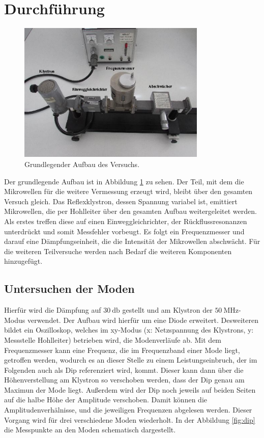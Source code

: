\section{Durchführung}
\label{sec:Durchführung}

\begin{figure}
    \centering
    \includegraphics[width=0.8\textwidth]{Bilder/grundaufbau.png}
    \caption{Grundlegender Aufbau des Versuchs.}
    \label{fig:grund}
\end{figure}
\FloatBarrier

Der grundlegende Aufbau ist in Abbildung \ref{fig:grund} zu sehen. Der Teil, mit dem die Mikrowellen für die weitere Vermessung erzeugt wird, bleibt über den 
gesamten Versuch gleich. Das Reflexklystron, dessen Spannung variabel ist, emittiert Mikrowellen, die per Hohlleiter über den gesamten Aufbau weitergeleitet werden. Als 
erstes treffen diese auf einen Einweggleichrichter, der Rückflussresonanzen unterdrückt und somit Messfehler vorbeugt. Es folgt ein Frequenzmesser und darauf eine Dämpfungseinheit,
die die Intensität der Mikrowellen abschwächt. Für die weiteren Teilversuche werden nach Bedarf die weiteren Komponenten hinzugefügt.

\subsection{Untersuchen der Moden}

Hierfür wird die Dämpfung auf $\SI{30}{\decibel} $ gestellt und am Klystron der $\SI{50}{\mega\hertz} $-Modus verwendet.
Der Aufbau wird hierfür um eine Diode erweitert. Desweiteren bildet ein Oszilloskop, welches im xy-Modus (x: Netzspannung des Klystrons, y: Messstelle Hohlleiter) 
betrieben wird, die Modenverläufe ab. Mit dem Frequenzmesser kann eine Frequenz, die im Frequenzband einer Mode liegt, getroffen werden, wodurch es an dieser Stelle zu einem 
Leistungseinbruch, der im Folgenden auch als Dip referenziert wird, kommt. Dieser kann dann über die Höhenverstellung am Klystron so verschoben werden, dass der Dip genau am 
Maximun der Mode liegt. Außerdem wird der Dip noch jeweils auf beiden Seiten auf die halbe Höhe der Amplitude verschoben. Damit können die Amplitudenverhälnisse, und die jeweiligen 
Frequenzen abgelesen werden. Dieser Vorgang wird für drei verschiedene Moden wiederholt. In der Abbildung \ref{fig:dip} die Messpunkte an den Moden schematisch dargestellt. 

